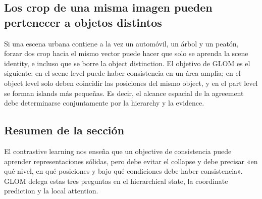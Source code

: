 \subsection{Los crop de una misma imagen pueden pertenecer a objetos distintos}

Si una escena urbana contiene a la vez un automóvil, un árbol y un peatón, forzar dos crop hacia el mismo vector puede hacer que solo se aprenda la scene identity, e incluso que se borre la object distinction. El objetivo de GLOM es el siguiente: en el scene level puede haber consistencia en un área amplia; en el object level solo deben coincidir las posiciones del mismo object, y en el part level se forman islands más pequeñas. Es decir, el alcance espacial de la agreement debe determinarse conjuntamente por la hierarchy y la evidence.




\subsection{Resumen de la sección}

El contrastive learning nos enseña que un objective de consistencia puede aprender representaciones sólidas, pero debe evitar el collapse y debe precisar «en qué nivel, en qué posiciones y bajo qué condiciones debe haber consistencia». GLOM delega estas tres preguntas en el hierarchical state, la coordinate prediction y la local attention.
